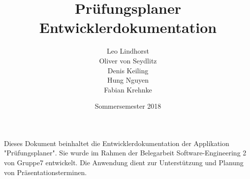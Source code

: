 \documentclass[a4paper,10pt]{scrartcl}
\begin{document}
	\title{Prüfungsplaner \\ Entwicklerdokumentation}
	\author{Leo Lindhorst\\
		Oliver von Seydlitz\\
		Denis Keiling\\
		Hung Nguyen\\
		Fabian Krehnke}
	\date{Sommersemester 2018}
	\maketitle
	
	Dieses Dokument beinhaltet die Entwicklerdokumentation der Applikation "Prüfungsplaner". Sie wurde im Rahmen der Belegarbeit Software-Engineering 2 von Gruppe7 entwickelt. Die Anwendung dient zur Unterstützung und Planung von Präsentationsterminen.
	
	\tableofcontents

  
  
  
  
  
\end{document}
